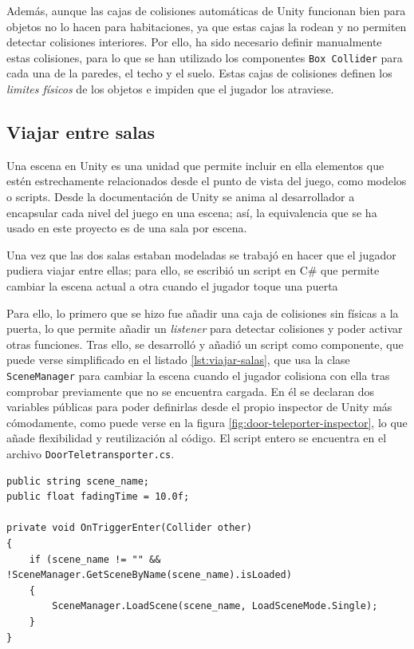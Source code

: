Además, aunque las cajas de colisiones automáticas de Unity funcionan bien para objetos no lo hacen para habitaciones, ya que estas cajas la rodean y no permiten detectar colisiones interiores. Por ello, ha sido necesario definir manualmente estas colisiones, para lo que se han utilizado los componentes \texttt{Box Collider} para cada una de la paredes, el techo y el suelo. Estas cajas de colisiones definen los \textit{limites físicos} de los objetos e impiden que el jugador los atraviese.

\subsection{Viajar entre salas}

Una escena en Unity es una unidad que permite incluir en ella elementos que estén estrechamente relacionados desde el punto de vista del juego, como modelos o scripts. Desde la documentación de Unity se anima al desarrollador a encapsular cada nivel del juego en una escena; así, la equivalencia que se ha usado en este proyecto es de una sala por escena.

Una vez que las dos salas estaban modeladas se trabajó en hacer que el jugador pudiera viajar entre ellas; para ello, se escribió un script en C\# que permite cambiar la escena actual a otra cuando el jugador toque una puerta 

Para ello, lo primero que se hizo fue añadir una caja de colisiones sin físicas a la puerta, lo que permite añadir un \textit{listener} para detectar colisiones y poder activar otras funciones. Tras ello, se desarrolló y añadió un script como componente, que puede verse simplificado en el listado \ref{lst:viajar-salas}, que usa la clase \texttt{SceneManager} para cambiar la escena cuando el jugador colisiona con ella tras comprobar previamente que no se encuentra cargada. En él se declaran dos variables públicas para poder definirlas desde el propio inspector de Unity más cómodamente, como puede verse en la figura \ref{fig:door-teleporter-inspector}, lo que añade flexibilidad y reutilización al código. El script entero se encuentra en el archivo \texttt{DoorTeletransporter.cs}.

\begin{lstlisting}[caption=Fragmento del script para viajar entre salas, label=lst:viajar-salas]
public string scene_name;
public float fadingTime = 10.0f;

private void OnTriggerEnter(Collider other)
{
    if (scene_name != "" && !SceneManager.GetSceneByName(scene_name).isLoaded)
    {
        SceneManager.LoadScene(scene_name, LoadSceneMode.Single);
    }
}
\end{lstlisting}

